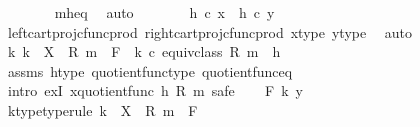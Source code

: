 \begin{isabellebody}
\ \ \ \ \ \ \isamarkupfalse%
\ m{\isacharunderscore}{\kern0pt}h{\isacharunderscore}{\kern0pt}eq\ \isamarkupfalse%
\ auto\isanewline
\ \ \ \ \isamarkupfalse%
\ \isamarkupfalse%
\ {\isachardoublequoteopen}h\ {\isasymcirc}\isactrlsub c\ x\ {\isacharequal}{\kern0pt}\ h\ {\isasymcirc}\isactrlsub c\ y{\isachardoublequoteclose}\isanewline
\ \ \ \ \ \ \isamarkupfalse%
\ left{\isacharunderscore}{\kern0pt}cart{\isacharunderscore}{\kern0pt}proj{\isacharunderscore}{\kern0pt}cfunc{\isacharunderscore}{\kern0pt}prod\ right{\isacharunderscore}{\kern0pt}cart{\isacharunderscore}{\kern0pt}proj{\isacharunderscore}{\kern0pt}cfunc{\isacharunderscore}{\kern0pt}prod\ x{\isacharunderscore}{\kern0pt}type\ y{\isacharunderscore}{\kern0pt}type\ \isamarkupfalse%
\ auto\isanewline
\ \ \isamarkupfalse%
\isanewline
\ \ \isamarkupfalse%
\ \isamarkupfalse%
\ {\isachardoublequoteopen}{\isasymexists}k{\isachardot}{\kern0pt}\ k\ {\isacharcolon}{\kern0pt}\ X\ {\isasymsslash}\ {\isacharparenleft}{\kern0pt}R{\isacharcomma}{\kern0pt}\ m{\isacharparenright}{\kern0pt}\ {\isasymrightarrow}\ F\ {\isasymand}\ k\ {\isasymcirc}\isactrlsub c\ equiv{\isacharunderscore}{\kern0pt}class\ {\isacharparenleft}{\kern0pt}R{\isacharcomma}{\kern0pt}\ m{\isacharparenright}{\kern0pt}\ {\isacharequal}{\kern0pt}\ h{\isachardoublequoteclose}\isanewline
\ \ \ \ \isamarkupfalse%
\ assms\ h{\isacharunderscore}{\kern0pt}type\ quotient{\isacharunderscore}{\kern0pt}func{\isacharunderscore}{\kern0pt}type\ quotient{\isacharunderscore}{\kern0pt}func{\isacharunderscore}{\kern0pt}eq\isanewline
\ \ \ \ \isamarkupfalse%
\ {\isacharparenleft}{\kern0pt}intro\ exI{\isacharbrackleft}{\kern0pt}\ x{\isacharequal}{\kern0pt}{\isachardoublequoteopen}quotient{\isacharunderscore}{\kern0pt}func\ h\ {\isacharparenleft}{\kern0pt}R{\isacharcomma}{\kern0pt}\ m{\isacharparenright}{\kern0pt}{\isachardoublequoteclose}{\isacharbrackright}{\kern0pt}{\isacharcomma}{\kern0pt}\ safe{\isacharparenright}{\kern0pt}\isanewline
{}\isamarkupfalse%
\isanewline
\ \ \isamarkupfalse%
\ F\ k\ y\isanewline
\ \ \isamarkupfalse%
\ k{\isacharunderscore}{\kern0pt}type{\isacharbrackleft}{\kern0pt}type{\isacharunderscore}{\kern0pt}rule{\isacharbrackright}{\kern0pt}{\isacharcolon}{\kern0pt}\ {\isachardoublequoteopen}k\ {\isacharcolon}{\kern0pt}\ X\ {\isasymsslash}\ {\isacharparenleft}{\kern0pt}R{\isacharcomma}{\kern0pt}\ m{\isacharparenright}{\kern0pt}\ {\isasymrightarrow}\ F{\isachardoublequoteclose}\isanewline

\end{isabellebody}
